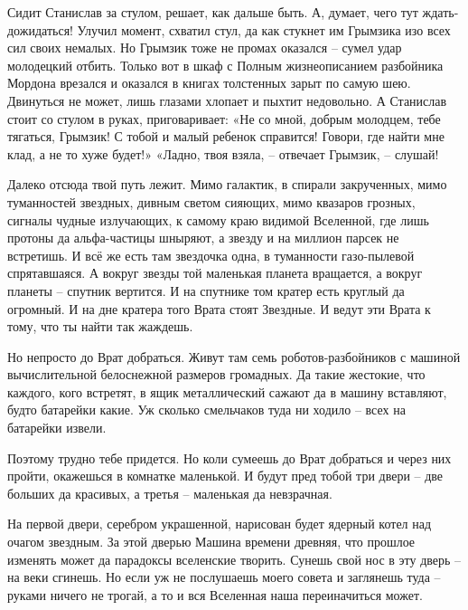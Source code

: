 \documentclass[ebook,oneside,final,openright]{memoir}
\begin{document}
\par
Сидит Станислав за стулом, решает, как дальше быть. А, думает, чего тут ждать-дожидаться! Улучил момент, схватил стул, да как стукнет им Грымзика изо всех сил своих немалых. Но Грымзик тоже не промах оказался – сумел удар молодецкий отбить. Только вот в шкаф с Полным жизнеописанием разбойника Мордона врезался и оказался в книгах толстенных зарыт по самую шею. Двинуться не может, лишь глазами хлопает и пыхтит недовольно. А Станислав стоит со стулом в руках, приговаривает: «Не со мной, добрым молодцем, тебе тягаться, Грымзик! С тобой и малый ребенок справится! Говори, где найти мне клад, а не то хуже будет!» «Ладно, твоя взяла, – отвечает Грымзик, – слушай!\par
\par
Далеко отсюда твой путь лежит. Мимо галактик, в спирали закрученных, мимо туманностей звездных, дивным светом сияющих, мимо квазаров грозных, сигналы чудные излучающих, к самому краю видимой Вселенной, где лишь протоны да альфа-частицы шныряют, а звезду и на миллион парсек не встретишь. И всё же есть там звездочка одна, в туманности газо-пылевой спрятавшаяся. А вокруг звезды той маленькая планета вращается, а вокруг планеты – спутник вертится. И на спутнике том кратер есть круглый да огромный. И на дне кратера того Врата стоят Звездные. И ведут эти Врата к тому, что ты найти так жаждешь.\par
\par
Но непросто до Врат добраться. Живут там семь роботов-разбойников с машиной вычислительной белоснежной размеров громадных. Да такие жестокие, что каждого, кого встретят, в ящик металлический сажают да в машину вставляют, будто батарейки какие. Уж сколько смельчаков туда ни ходило – всех на батарейки извели.\par
\par
Поэтому трудно тебе придется. Но коли сумеешь до Врат добраться и через них пройти, окажешься в комнатке маленькой. И будут пред тобой три двери – две больших да красивых, а третья – маленькая да невзрачная.\par
\par
На первой двери, серебром украшенной, нарисован будет ядерный котел над очагом звездным. За этой дверью Машина времени древняя, что прошлое изменять может да парадоксы вселенские творить. Сунешь свой нос в эту дверь – на веки сгинешь. Но если уж не послушаешь моего совета и заглянешь туда – руками ничего не трогай, а то и вся Вселенная наша переиначиться может.\par
\par
\end{document}
